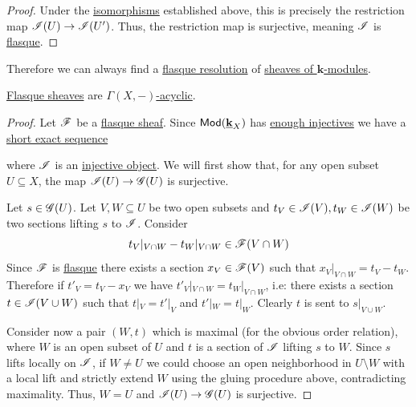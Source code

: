 \documentclass[../../main]{subfiles}
\begin{document}
\begin{proof}
  Under the \hyperref[def:categorical-isomorphism]{isomorphisms} established above, this is precisely the restriction map \(\mathscr{I}(U) \to \mathscr{I}(U')\). Thus, the restriction map is surjective, meaning \(\mathscr{I}\) is \hyperref[def:flasque-sheaf]{flasque}.
\end{proof}

Therefore we can always find a \hyperref[def:flasque-sheaf]{flasque resolution} of \hyperref[def:sheaf]{sheaves of \(\mathbf{k}\)-modules}.

\begin{proposition}\label{prop:flasque-are-acyclic}
  \hyperref[def:flasque-sheaf]{Flasque sheaves} are \hyperref[def:F-acyclic-object]{\(\Gamma(X, -)\)-acyclic}.
\end{proposition}
\begin{proof}
  Let \(\mathscr{F}\) be a \hyperref[def:flasque-sheaf]{flasque sheaf}.
  Since \(\mathsf{Mod}(\underline{\mathbf{k}}_{X})\) has \hyperref[def:enough-injectives-projectives]{enough injectives} we have a \hyperref[def:exact-sequence]{short exact sequence}
  \begin{center}
  \end{center}
  where \(\mathscr{I}\) is an \hyperref[def:injective-projective-object]{injective object}.
  We will first show that, for any open subset \(U \subseteq X\), the map \(\mathscr{I}(U) \to \mathscr{G}(U)\) is surjective.
  
  Let \(s \in \mathscr{G}(U)\).
  Let \(V, W \subseteq U\) be two open subsets and \(t_{V} \in \mathscr{I}(V), t_{W} \in \mathscr{I}(W)\) be two sections lifting \(s\) to \(\mathscr{I}\).
  Consider
  \begin{equation*}
    t_{V}|_{V \cap W} - t_{W}|_{V \cap W} \in \mathscr{F}(V \cap W)
  \end{equation*}
  Since \(\mathscr{F}\) is \hyperref[def:flasque-sheaf]{flasque} there exists a section \(x_{V} \in \mathscr{F}(V)\) such that \(x_{V}|_{V \cap W} = t_{V} - t_{W}\).
  Therefore if \(t'_{V} = t_{V} - x_{V}\) we have \(t'_{V}|_{V \cap W} = t_{W}|_{V \cap W}\), i.e: there exists a section \(t \in \mathscr{I}(V \cup W)\) such that \(t|_{V} = t'|_{V}\) and \(t'|_{W} = t|_{W}\).
  Clearly \(t\) is sent to \(s|_{V \cup W}\).

  Consider now a pair \((W, t)\) which is maximal (for the obvious order relation), where \(W\) is an open subset of \(U\) and \(t\) is a section of \(\mathscr{I}\) lifting \(s\) to \(W\).
  Since \(s\) lifts locally on \(\mathscr{I}\), if \(W \neq U\) we could choose an open neighborhood in \(U \setminus W\) with a local lift and strictly extend \(W\) using the gluing procedure above, contradicting maximality. Thus, \(W = U\) and \(\mathscr{I}(U) \to \mathscr{G}(U)\) is surjective.
  

\end{proof}
\end{document}

